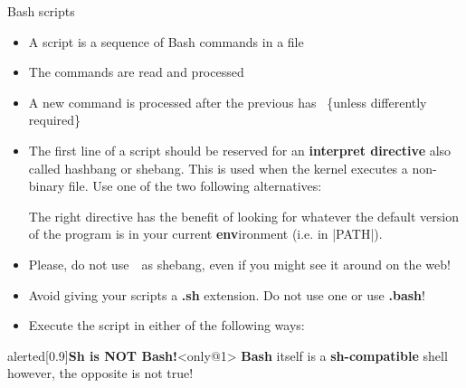 \begin{frame}[fragile]{Bash scripts}
    \vspace{-6mm}
    \begin{itemize}
        \item A script is a sequence of Bash commands in a file
        \item The commands are read and processed 
        \item A new command is processed after the previous has  {\tiny~\{unless differently required\}}
        \item The first line of a script should be reserved for an \textbf{interpret directive} also called \alert{hashbang} or \alert{shebang}.
              This is used when the kernel executes a non-binary file.
              Use one of the two following alternatives: \\
              \begin{center}
                  \par{\ssmall The right directive has the benefit of looking for whatever the default version of the program is in your current \textbf{env}ironment (i.e. in \bash|PATH|).}
              \end{center}
        \item<only@1> Please, \alert{do not use} \,\, as shebang, even if you might see it around on the web!
        \item<only@1> Avoid giving your scripts a \textbf{.sh} extension. Do not use one or use \alert{\textbf{.bash}}!
        \item<only@2> Execute the script in either of the following ways:
    \end{itemize}
    \begin{varblock}{alerted}[0.9\textwidth]{\textbf{Sh is NOT Bash!}}<only@1>
        \textbf{Bash} itself is a \textbf{sh-compatible} shell however, the opposite is not true!

\end{varblock}
\end{frame}
